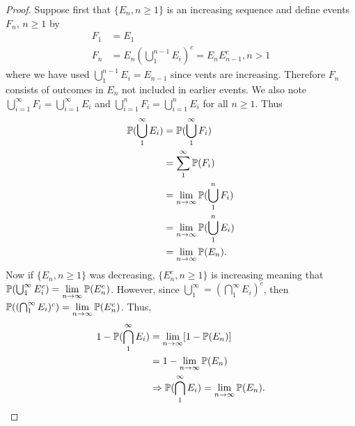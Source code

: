\documentclass[a4paper,11pt]{article}
\begin{document}
\begin{outline}
    \begin{proof}
      Suppose first that \(\{E_n, n \geq 1\}\) is an increasing sequence and define events \(F_n\), \(n \geq 1\) by
      \begin{align*}
        F_1 &= E_1\\
        F_n &= E_n(\bigcup_{1}^{n-1}E_i)^c = E_nE_{n-1}^c, n > 1
      \end{align*}
      where we have used \(\bigcup_{1}^{n-1}E_i = E_{n-1}\) since vents are increasing. Therefore \(F_n\) consists
      of outcomes in \(E_n\) not included in earlier events. We also note \(\bigcup_{i=1}^{\infty} F_i = 
      \bigcup_{i=1}^{\infty} E_i\) and \(\bigcup_{i=1}^{n} F_i = \bigcup_{i=1}^{n} E_i\) for all \(n \geq 1\). Thus 
      \begin{align*}
        \mathbb{P}(\bigcup_{1}^{\infty} E_i) &= \mathbb{P}(\bigcup_{1}^{\infty} F_i)\\
                                             &= \sum_{1}^{\infty} \mathbb{P}(F_i)\\
                                             &= \lim_{n\rightarrow\infty} \mathbb{P}(\bigcup_{1}^n F_i)\\
                                             &= \lim_{n\rightarrow\infty} \mathbb{P}(\bigcup_{1}^n E_i)\\
                                             &= \lim_{n\rightarrow\infty} \mathbb{P}(E_n)\text{.}
      \end{align*}
      Now if \(\{E_n, n \geq 1\}\) was decreasing, \(\{E_n^c, n \geq 1\}\) is increasing meaning that
      \(\mathbb{P}(\bigcup_{1}^{\infty} E_i^c) = \lim\limits_{n\rightarrow\infty} \mathbb{P}(E_n^c)\).
      However, since \(\bigcup_{1}^{\infty} = (\bigcap_{1}^{\infty}E_i)^c\), then 
      \(\mathbb{P}((\bigcap_{1}^{\infty}E_i)^c) = \lim\limits_{n\rightarrow\infty} \mathbb{P}(E_n^c)\). Thus,
      \begin{align*}
        1 - \mathbb{P}(\bigcap_{1}^{\infty} E_i) &= \lim_{n\rightarrow\infty} [1-\mathbb{P}(E_n)] \\
                                                 &= 1 - \lim_{n\rightarrow\infty} \mathbb{P}(E_n) \\
                                                 &\Rightarrow \mathbb{P}(\bigcap_{1}^{\infty} E_i) = 
                                                  \lim_{n\rightarrow\infty}\mathbb{P}(E_n)\text{.}
      \end{align*}
    \end{proof}
    
\end{outline}
\end{document}
